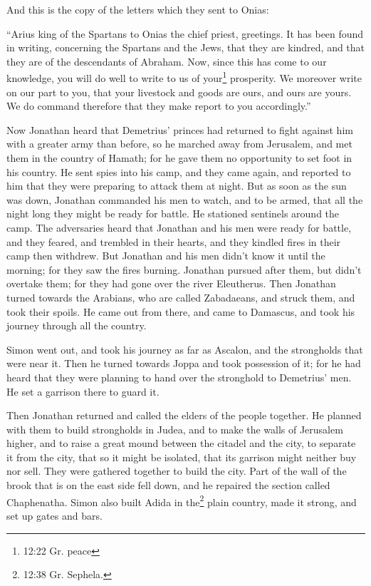  And this is the copy of the letters which they sent to
Onias:

 ``Arius king of the Spartans to Onias the chief priest,
greetings.  It has been found in writing, concerning the
Spartans and the Jews, that they are kindred, and that they are of the
descendants of Abraham.  Now, since this has come to our
knowledge, you will do well to write to us of your\footnote{12:22 Gr.
  peace} prosperity.  We moreover write on our part to you,
that your livestock and goods are ours, and ours are yours. We do
command therefore that they make report to you accordingly.''

 Now Jonathan heard that Demetrius' princes had returned to
fight against him with a greater army than before,  so he
marched away from Jerusalem, and met them in the country of Hamath; for
he gave them no opportunity to set foot in his country.  He
sent spies into his camp, and they came again, and reported to him that
they were preparing to attack them at night.  But as soon
as the sun was down, Jonathan commanded his men to watch, and to be
armed, that all the night long they might be ready for battle. He
stationed sentinels around the camp.  The adversaries heard
that Jonathan and his men were ready for battle, and they feared, and
trembled in their hearts, and they kindled fires in their camp then
withdrew.  But Jonathan and his men didn't know it until
the morning; for they saw the fires burning.  Jonathan
pursued after them, but didn't overtake them; for they had gone over the
river Eleutherus.  Then Jonathan turned towards the
Arabians, who are called Zabadaeans, and struck them, and took their
spoils.  He came out from there, and came to Damascus, and
took his journey through all the country.

 Simon went out, and took his journey as far as Ascalon,
and the strongholds that were near it. Then he turned towards Joppa and
took possession of it;  for he had heard that they were
planning to hand over the stronghold to Demetrius' men. He set a
garrison there to guard it.

 Then Jonathan returned and called the elders of the people
together. He planned with them to build strongholds in Judea,
 and to make the walls of Jerusalem higher, and to raise a
great mound between the citadel and the city, to separate it from the
city, that so it might be isolated, that its garrison might neither buy
nor sell.  They were gathered together to build the city.
Part of the wall of the brook that is on the east side fell down, and he
repaired the section called Chaphenatha.  Simon also built
Adida in the\footnote{12:38 Gr. Sephela.} plain country, made it strong,
and set up gates and bars.

